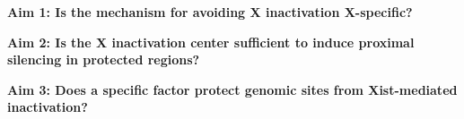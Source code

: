 \documentclass[12pt]{article}
\begin{document}
\vspace{12pt}
\noindent
\textbf{Aim 1: Is the mechanism for avoiding X inactivation X-specific?}





\vspace{12pt}
\noindent
\textbf{Aim 2: Is the X inactivation center sufficient to induce proximal silencing in protected regions?}




\vspace{12pt}
\noindent
\textbf{Aim 3: Does a specific factor protect genomic sites from Xist-mediated inactivation?}


\pagebreak
{}

\end{document}
